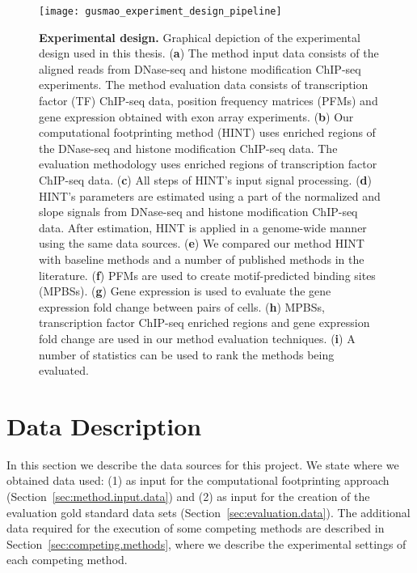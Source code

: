 \begin{figure}[h!]
\centering
\texttt{[image: gusmao\_experiment\_design\_pipeline]}
\caption[Experimental design]{\textbf{Experimental design.} Graphical depiction of the experimental design used in this thesis. (\textbf{a}) The method input data consists of the aligned reads from DNase-seq and histone modification ChIP-seq experiments. The method evaluation data consists of transcription factor (TF) ChIP-seq data, position frequency matrices (PFMs) and gene expression obtained with exon array experiments. (\textbf{b}) Our computational footprinting method (HINT) uses enriched regions of the DNase-seq and histone modification ChIP-seq data. The evaluation methodology uses enriched regions of transcription factor ChIP-seq data. (\textbf{c}) All steps of HINT's input signal processing. (\textbf{d}) HINT's parameters are estimated using a part of the normalized and slope signals from DNase-seq and histone modification ChIP-seq data. After estimation, HINT is applied in a genome-wide manner using the same data sources. (\textbf{e}) We compared our method HINT with baseline methods and a number of published methods in the literature. (\textbf{f}) PFMs are used to create motif-predicted binding sites (MPBSs). (\textbf{g}) Gene expression is used to evaluate the gene expression fold change between pairs of cells. (\textbf{h}) MPBSs, transcription factor ChIP-seq enriched regions and gene expression fold change are used in our method evaluation techniques. (\textbf{i}) A number of statistics can be used to rank the methods being evaluated.}
\label{fig:gusmao_experiment_design_pipeline}
\end{figure}

\section{Data Description}
\label{sec:data.description}

In this section we describe the data sources for this project. We state where we obtained data used: (1) as input for the computational footprinting approach (Section~\ref{sec:method.input.data}) and (2) as input for the creation of the evaluation gold standard data sets (Section~\ref{sec:evaluation.data}). The additional data required for the execution of some competing methods are described in Section~\ref{sec:competing.methods}, where we describe the experimental settings of each competing method.

